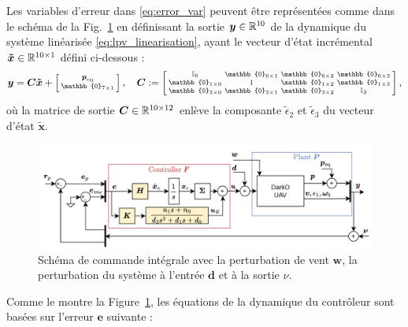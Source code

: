 Les variables d'erreur dans \eqref{eq:error_var} peuvent être représentées comme dans le schéma  de la Fig.~\ref{fig:commande_int6DOF} en définissant la sortie $\boldsymbol{y}\in {\mathbb R}^{10}$ de la dynamique du système linéarisée \eqref{eq:lpv_linearisation}, ayant le vecteur d'état incrémental $\boldsymbol{\tilde{x}} \in {\mathbb R}^{10 \times 1}$ défini ci-dessous : 
\begin{align}
    \label{eq:output_lin}
    \boldsymbol{y} = \boldsymbol{C} \boldsymbol{\tilde{x}} + \smallmat{\boldsymbol{p}_{\mathrm{eq}} \\ \mathbb{0}_{7 \times 1}}, \quad
 \boldsymbol{C} := \smallmat{\mathbb{I}_{6} & \mathbb{0}_{6\times 1} & \mathbb{0}_{6\times 2} &\mathbb{0}_{6\times 3}\\
    \mathbb{0}_{1\times 6} & 1 & \mathbb{0}_{1\times 2} &\mathbb{0}_{1\times 3}\\
    \mathbb{0}_{3\times 6} & \mathbb{0}_{3\times 1} & \mathbb{0}_{3\times 2} &  \mathbb{I}_{3}
},
\end{align}
où la matrice de sortie $\boldsymbol{C} \in {\mathbb R}^{10\times12}$ enlève la composante $\tilde{\epsilon}_{2}$ et $\tilde{\epsilon}_{3}$ du vecteur d'état $\tilde{\boldsymbol{x}}$. 

\begin{figure}[t!]
    \centering
    \includegraphics[width=0.6\columnwidth]{figures/commande_integrale.png}
    \caption{Schéma de commande intégrale avec la perturbation de vent $\boldsymbol{w}$, la perturbation du système à l'entrée $\boldsymbol{d}$ et à la sortie $\nu$.}
    \label{fig:commande_int6DOF}
\end{figure}

Comme le montre la Figure~\ref{fig:commande_int6DOF}, les équations de la dynamique du contrôleur sont basées sur l'erreur $\boldsymbol{e}$ suivante :

